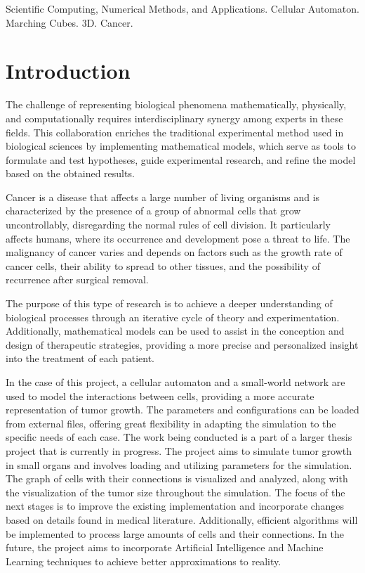 \documentclass[a4paper,11pt]{article}
\begin{document}
{{\vskip 0.2cm  %


{\small{ %
 Scientific Computing, Numerical Methods, and Applications. Cellular Automaton. Marching Cubes. 3D. Cancer.
}}
}


\section*{Introduction}

The challenge of representing biological phenomena mathematically, physically, and computationally requires interdisciplinary synergy among experts in these fields. This collaboration enriches the traditional experimental method used in biological sciences by implementing mathematical models, which serve as tools to formulate and test hypotheses, guide experimental research, and refine the model based on the obtained results.~\cite{7}

Cancer is a disease that affects a large number of living organisms and is characterized by the presence of a group of abnormal cells that grow uncontrollably, disregarding the normal rules of cell division. It particularly affects humans, where its occurrence and development pose a threat to life. The malignancy of cancer varies and depends on factors such as the growth rate of cancer cells, their ability to spread to other tissues, and the possibility of recurrence after surgical removal.~\cite{7} 

The purpose of this type of research is to achieve a deeper understanding of biological processes through an iterative cycle of theory and experimentation. Additionally, mathematical models can be used to assist in the conception and design of therapeutic strategies, providing a more precise and personalized insight into the treatment of each patient.~\cite{7}

In the case of this project, a cellular automaton and a small-world network are used to model the interactions between cells, providing a more accurate representation of tumor growth. The parameters and configurations can be loaded from external files, offering great flexibility in adapting the simulation to the specific needs of each case. The work being conducted is a part of a larger thesis project that is currently in progress. The project aims to simulate tumor growth in small organs and involves loading and utilizing parameters for the simulation. The graph of cells with their connections is visualized and analyzed, along with the visualization of the tumor size throughout the simulation. The focus of the next stages is to improve the existing implementation and incorporate changes based on details found in medical literature. Additionally, efficient algorithms will be implemented to process large amounts of cells and their connections. In the future, the project aims to incorporate Artificial Intelligence and Machine Learning techniques to achieve better approximations to reality.

}
\end{document}

